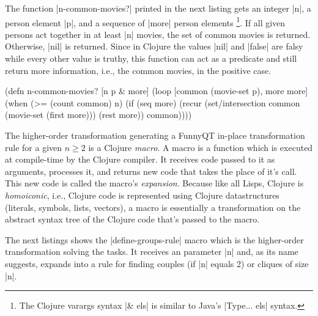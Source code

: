 \documentclass[submission]{eptcs}
\newcommand{\code}{\clojureinline}
\begin{document}
The function \code|n-common-movies?| printed in the next listing gets an
integer \code|n|, a person element \code|p|, and a sequence of \code|more|
person elements \footnote{The Clojure varargs syntax \code|& els| is similar to
  Java's \code|Type... els| syntax.}.  If all given persons act together in at
least \code|n| movies, the set of common movies is returned.  Otherwise,
\code|nil| is returned.  Since in Clojure the values \code|nil| and
\code|false| are falsy while every other value is truthy, this function can act
as a predicate and still return more information, i.e., the common movies, in
the positive case.

\begin{clojurecode}
(defn n-common-movies? [n p & more]
  (loop [common (movie-set p), more more]
    (when (>= (count common) n)
      (if (seq more)
        (recur (set/intersection common (movie-set (first more))) (rest more))
        common))))
\end{clojurecode}

The higher-order transformation generating a FunnyQT in-place transformation
rule for a given \(n \geq 2\)
is a Clojure \emph{macro}.  A macro is a function which is executed at
compile-time by the Clojure compiler.  It receives code passed to it as
arguments, processes it, and returns new code that takes the place of it's
call.  This new code is called the macro's \emph{expansion}.  Because like all
Lisps, Clojure is \emph{homoiconic}, i.e., Clojure code is represented using
Clojure datastructures (literals, symbols, lists, vectors), a macro is
essentially a transformation on the abstract syntax tree of the Clojure code
that's passed to the macro.

The next listings shows the \code|define-groups-rule| macro which is the
higher-order transformation solving the tasks.  It receives an parameter
\code|n| and, as its name suggests, expands into a rule for finding couples (if
\code|n| equals 2) or cliques of size \code|n|.
\end{document}
